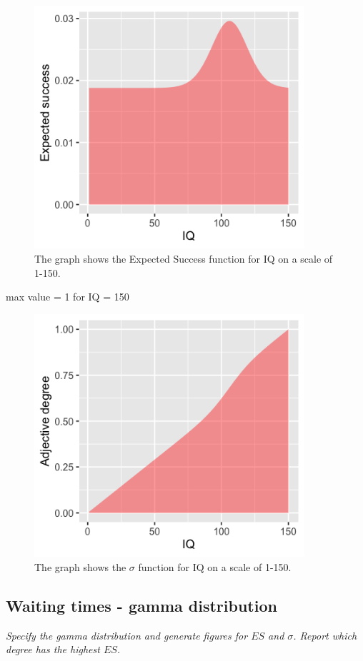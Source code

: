 \documentclass[11pt,a4paper,oneside]{article}
\begin{document}
\begin{figure}[H]
    \centering
    \includegraphics[width=100mm]{figs/Question_2_IQ_es.png}
    \caption{The graph shows the Expected Success function for IQ on a scale of 1-150.}
  \label{fig:q2_iq_es}
\end{figure}

max value = 1 for IQ = 150

\begin{figure}[H]
    \centering
    \includegraphics[width=100mm]{figs/Question_2_IQ_sigma.png}
    \caption{The graph shows the $\sigma$ function for IQ on a scale of 1-150.}
  \label{fig:q2_iq_es}
\end{figure}


\subsection{Waiting times - gamma distribution}
\textit{Specify the gamma distribution and generate figures for $ES$ and $\sigma$. Report which degree has the highest $ES$.}\\
\end{document}
